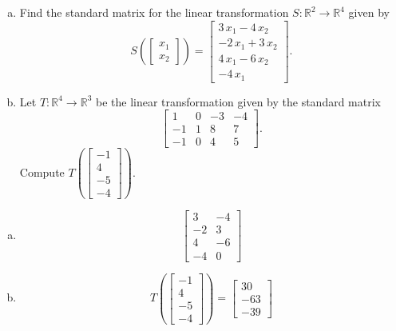 
\begin{exerciseStatement}

\begin{enumerate}[(a)]
\item Find the standard matrix for the linear transformation \(S:\mathbb{R}^ 2  \to \mathbb{R}^ 4 \) given by \[S\left(  \left[\begin{array}{c}
x_{1} \\
x_{2}
\end{array}\right]  \right) =  \left[\begin{array}{c}
3 \, x_{1} - 4 \, x_{2} \\
-2 \, x_{1} + 3 \, x_{2} \\
4 \, x_{1} - 6 \, x_{2} \\
-4 \, x_{1}
\end{array}\right] .\]
\item Let \(T:\mathbb{R}^ 4  \to \mathbb{R}^ 3 \) be the linear transformation given by the standard matrix \[ \left[\begin{array}{cccc}
1 & 0 & -3 & -4 \\
-1 & 1 & 8 & 7 \\
-1 & 0 & 4 & 5
\end{array}\right] .\] Compute \(T\left( \left[\begin{array}{c}
-1 \\
4 \\
-5 \\
-4
\end{array}\right]  \right)\). 
\end{enumerate}
    
\end{exerciseStatement}
    
\begin{exerciseAnswer} 

\begin{enumerate}[(a)]
\item \[ \left[\begin{array}{cc}
3 & -4 \\
-2 & 3 \\
4 & -6 \\
-4 & 0
\end{array}\right] \]
\item \[T\left( \left[\begin{array}{c}
-1 \\
4 \\
-5 \\
-4
\end{array}\right]  \right)= \left[\begin{array}{c}
30 \\
-63 \\
-39
\end{array}\right] \]
\end{enumerate}
    
\end{exerciseAnswer}
    
